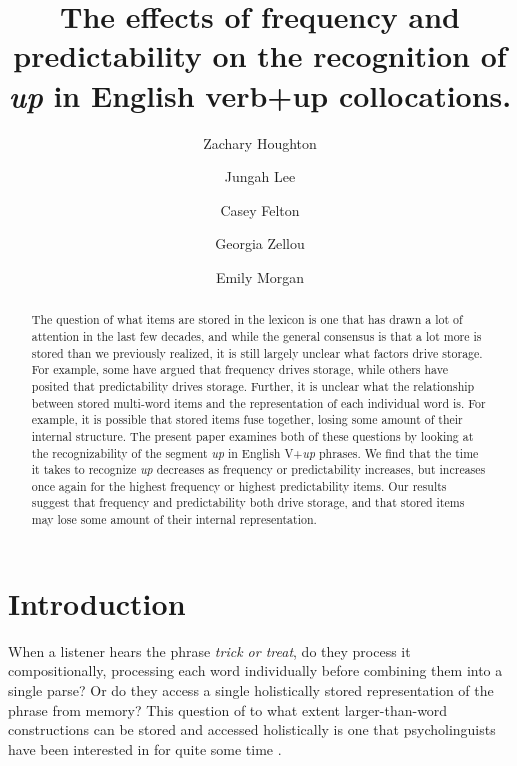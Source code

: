 \documentclass[
  authoryear,
  preprint,
  1p,
  onecolumn]{elsarticle}
\begin{document}
\begin{frontmatter}
\title{The effects of frequency and predictability on the recognition of
\emph{up} in English verb+up collocations.}
\author[1]{Zachary Houghton%
%
}
\author[2]{Jungah Lee%
%
}

\author[1]{Casey Felton%
%
}

\author[1]{Georgia Zellou%
%
}

\author[1]{Emily Morgan%
%
}








        
\begin{abstract}
The question of what items are stored in the lexicon is one that has
drawn a lot of attention in the last few decades, and while the general
consensus is that a lot more is stored than we previously realized, it
is still largely unclear what factors drive storage. For example, some
have argued that frequency drives storage, while others have posited
that predictability drives storage. Further, it is unclear what the
relationship between stored multi-word items and the representation of
each individual word is. For example, it is possible that stored items
fuse together, losing some amount of their internal structure. The
present paper examines both of these questions by looking at the
recognizability of the segment \emph{up} in English V+\emph{up} phrases.
We find that the time it takes to recognize \emph{up} decreases as
frequency or predictability increases, but increases once again for the
highest frequency or highest predictability items. Our results suggest
that frequency and predictability both drive storage, and that stored
items may lose some amount of their internal representation.
\end{abstract}





\end{frontmatter}
    

\section{Introduction}\label{introduction}

When a listener hears the phrase \emph{trick or treat}, do they process
it compositionally, processing each word individually before combining
them into a single parse? Or do they access a single holistically stored
representation of the phrase from memory? This question of to what
extent larger-than-word constructions can be stored and accessed
holistically is one that psycholinguists have been interested in for
quite some time
\citep[e.g.,][]{bybee2002, bybee2003, goldberg2003, nooteboom2002, stembergerFrequencyLexicalStorage1986, stemberger2004}.
\end{document}
